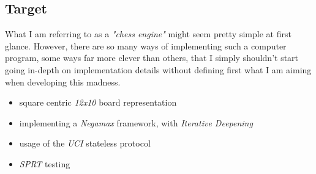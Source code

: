 \subsection{Target}
What I am referring to as a \textit{"chess engine"} might seem pretty simple at first glance. However, there are so many ways of implementing such a computer program, some ways far more clever than others, that I simply shouldn't start going in-depth on implementation details without defining first what I am aiming when developing this madness.

\begin{itemize}
    \item square centric \textit{12x10} board representation
    \item implementing a \textit{Negamax} framework, with \textit{Iterative Deepening}
    \item usage of the \textit{UCI} stateless protocol
    \item \textit{SPRT} testing
\end{itemize}
